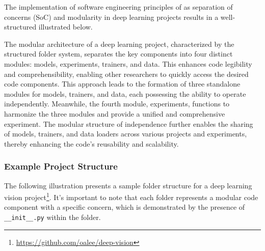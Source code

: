 \documentclass{IEEEtran}
\begin{document}
The implementation of software engineering principles of as separation of concerns (SoC) and modularity in deep learning projects results in a well-structured illustrated below. 
\vspace{0.7em}


The modular architecture of a deep learning project, characterized by the structured folder system, separates the key components into four distinct modules: models, experiments, trainers, and data. This enhances code legibility and comprehensibility, enabling other researchers to quickly access the desired code components. This approach leads to the formation of three standalone modules for models, trainers, and data, each possessing the ability to operate independently. Meanwhile, the fourth module, experiments, functions to harmonize the three modules and provide a unified and comprehensive experiment. The modular structure of independence further enables the sharing of models, trainers, and data loaders across various projects and experiments, thereby enhancing the code's reusability and scalability. 


\subsubsection{Example Project Structure}

The following illustration presents a sample folder structure for a deep learning vision project\footnote{ \url{https://github.com/oalee/deep-vision}}. It's important to note that each folder represents a modular code component with a specific concern, which is demonstrated by the presence of \verb|__init__.py| within the folder.
\end{document}
